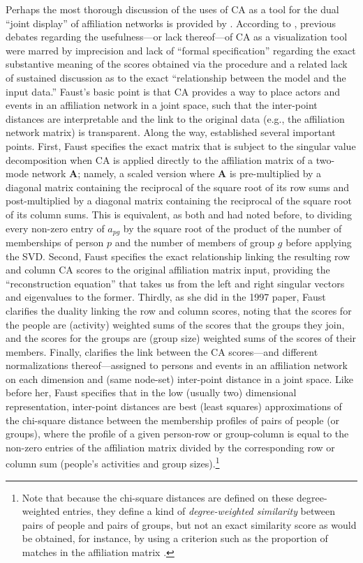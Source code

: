 \documentclass[a4paper,fleqn]{cas-sc}
\begin{document}
Perhaps the most thorough discussion of the uses of CA as a tool for the dual ``joint display'' of affiliation networks is provided by \citet{faust2005using}. According to \citet[118]{faust2005using}, previous debates regarding the usefulness---or lack thereof---of CA as a visualization tool were marred by imprecision and lack of ``formal specification'' regarding the exact substantive meaning of the scores obtained via the procedure and a related lack of sustained discussion as to the exact ``relationship between the model and the input data.'' Faust's basic point is that CA provides a way to place actors and events in an affiliation network in a joint space, such that the inter-point distances are interpretable and the link to the original data (e.g., the affiliation network matrix) is transparent. Along the way, \citet{faust2005using} established several important points. First, Faust specifies the exact matrix that is subject to the singular value decomposition when CA is applied directly to the affiliation matrix of a two-mode network $\mathbf{A}$; namely, a scaled version where $\mathbf{A}$ is pre-multiplied by a diagonal matrix containing the reciprocal of the square root of its row sums and post-multiplied by a diagonal matrix containing the reciprocal of the square root of its column sums. This is equivalent, as both \citet{faust1997centrality} and \citet{roberts2000correspondence} had noted before, to dividing every non-zero entry of $a_{pg}$ by the square root of the product of the number of memberships of person $p$ and the number of members of group $g$ before applying the SVD. Second, Faust specifies the exact relationship linking the resulting row and column CA scores to the original affiliation matrix input, providing the ``reconstruction equation'' that takes us from the left and right singular vectors and eigenvalues to the former. Thirdly, as she did in the 1997 paper, Faust clarifies the duality linking the row and column scores, noting that the scores for the people are (activity) weighted sums of the scores that the groups they join, and the scores for the groups are (group size) weighted sums of the scores of their members. Finally, \citet[128ff]{faust2005using} clarifies the link between the CA scores---and different normalizations thereof---assigned to persons and events in an affiliation network on each dimension and (same node-set) inter-point distance in a joint space. Like \citet{roberts2000correspondence} before her, Faust specifies that in the low (usually two) dimensional representation, inter-point distances are best (least squares) approximations of the chi-square distance between the membership profiles of pairs of people (or groups), where the profile of a given person-row or group-column is equal to the non-zero entries of the affiliation matrix divided by the corresponding row or column sum (people's activities and group sizes).\footnote{Note that because the chi-square distances are defined on these degree-weighted entries, they define a kind of \textit{degree-weighted similarity} between pairs of people and pairs of groups, but not an exact similarity score as would be obtained, for instance, by using a criterion such as the proportion of matches in the affiliation matrix \citep[208]{everett2013dual}.}
\end{document}
